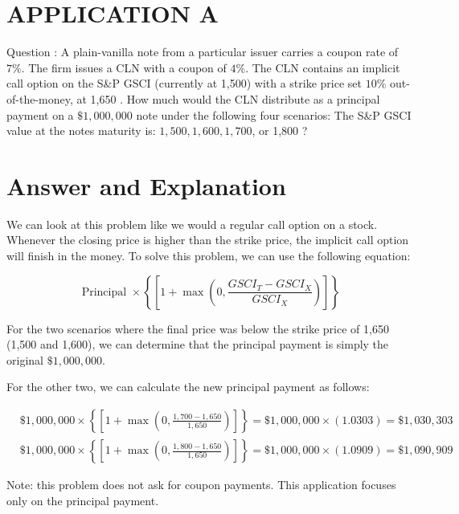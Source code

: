 \documentclass[11pt]{article}
\begin{document}
\section*{APPLICATION A}
Question : A plain-vanilla note from a particular issuer carries a coupon rate of $7 \%$. The firm issues a CLN with a coupon of $4 \%$. The CLN contains an implicit call option on the S\&P GSCI (currently at 1,500) with a strike price set $10 \%$ out-of-the-money, at 1,650 . How much would the CLN distribute as a principal payment on a $\$ 1,000,000$ note under the following four scenarios: The S\&P GSCI value at the notes maturity is: $1,500,1,600,1,700$, or 1,800 ?

\section*{Answer and Explanation}
We can look at this problem like we would a regular call option on a stock. Whenever the closing price is higher than the strike price, the implicit call option will finish in the money. To solve this problem, we can use the following equation:

$$
\text { Principal } \times\left\{\left[1+\max \left(0, \frac{G S C I_{T}-G S C I_{X}}{G S C I_{X}}\right)\right]\right\}
$$

For the two scenarios where the final price was below the strike price of 1,650 (1,500 and 1,600), we can determine that the principal payment is simply the original $\$ 1,000,000$.

For the other two, we can calculate the new principal payment as follows:

$$
\begin{aligned}
& \$ 1,000,000 \times\left\{\left[1+\max \left(0, \frac{1,700-1,650}{1,650}\right)\right]\right\}=\$ 1,000,000 \times(1.0303)=\$ 1,030,303 \\
& \$ 1,000,000 \times\left\{\left[1+\max \left(0, \frac{1,800-1,650}{1,650}\right)\right]\right\}=\$ 1,000,000 \times(1.0909)=\$ 1,090,909
\end{aligned}
$$

Note: this problem does not ask for coupon payments. This application focuses only on the principal payment.
\end{document}
